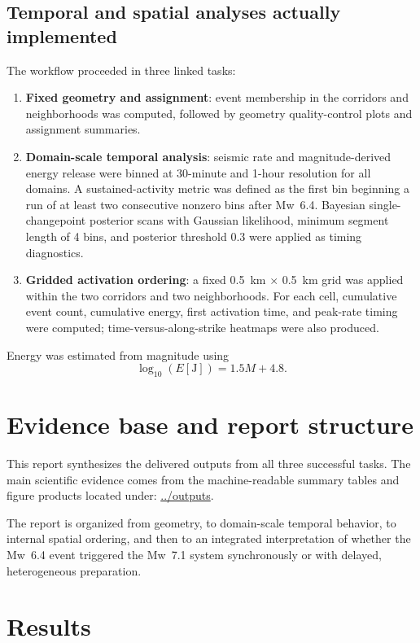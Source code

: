 \documentclass[11pt]{article}
\begin{document}
\subsection{Temporal and spatial analyses actually implemented}
The workflow proceeded in three linked tasks:
\begin{enumerate}[label=\arabic*)]
    \item \textbf{Fixed geometry and assignment}: event membership in the corridors and neighborhoods was computed, followed by geometry quality-control plots and assignment summaries.
    \item \textbf{Domain-scale temporal analysis}: seismic rate and magnitude-derived energy release were binned at 30-minute and 1-hour resolution for all domains. A sustained-activity metric was defined as the first bin beginning a run of at least two consecutive nonzero bins after Mw~6.4. Bayesian single-changepoint posterior scans with Gaussian likelihood, minimum segment length of 4 bins, and posterior threshold 0.3 were applied as timing diagnostics.
    \item \textbf{Gridded activation ordering}: a fixed 0.5~km $\times$ 0.5~km grid was applied within the two corridors and two neighborhoods. For each cell, cumulative event count, cumulative energy, first activation time, and peak-rate timing were computed; time-versus-along-strike heatmaps were also produced.
\end{enumerate}
Energy was estimated from magnitude using
\[
\log_{10}(E[\mathrm{J}]) = 1.5M + 4.8.
\]

\section{Evidence base and report structure}
This report synthesizes the delivered outputs from all three successful tasks. The main scientific evidence comes from the machine-readable summary tables and figure products located under:
\url{../outputs}.

The report is organized from geometry, to domain-scale temporal behavior, to internal spatial ordering, and then to an integrated interpretation of whether the Mw~6.4 event triggered the Mw~7.1 system synchronously or with delayed, heterogeneous preparation.

\section{Results}
\end{document}
